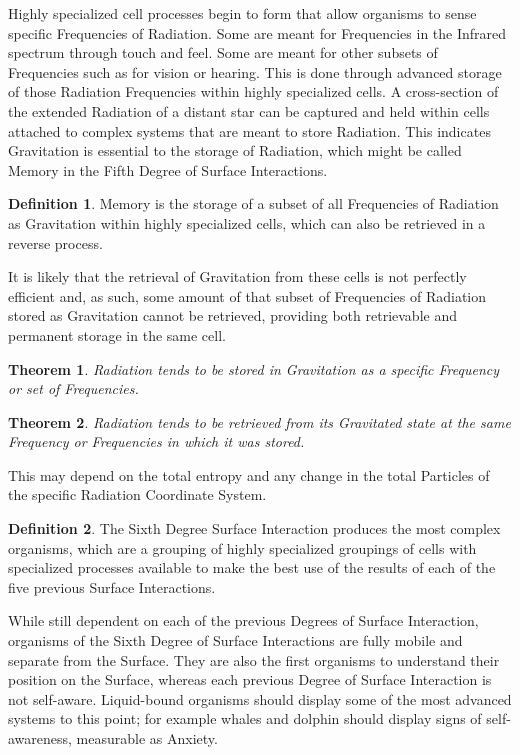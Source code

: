\documentclass[12pt]{article}
\theoremstyle{plain}
\newtheorem{theorem}{Theorem}
\theoremstyle{definition}
\newtheorem{definition}{Definition}
\begin{document}
Highly specialized cell processes begin to form that allow organisms to sense specific Frequencies of Radiation. Some are meant for Frequencies in the Infrared spectrum through touch and feel. Some are meant for other subsets of Frequencies such as for vision or hearing. This is done through advanced storage of those Radiation Frequencies within highly specialized cells. A cross-section of the extended Radiation of a distant star can be captured and held within cells attached to complex systems that are meant to store Radiation. This indicates Gravitation is essential to the storage of Radiation, which might be called Memory in the Fifth Degree of Surface Interactions.

\begin{definition}
Memory is the storage of a subset of all Frequencies of Radiation as Gravitation within highly specialized cells, which can also be retrieved in a reverse process.
\end{definition}

It is likely that the retrieval of Gravitation from these cells is not perfectly efficient and, as such, some amount of that subset of Frequencies of Radiation stored as Gravitation cannot be retrieved, providing both retrievable and permanent storage in the same cell.

\begin{theorem}
Radiation tends to be stored in Gravitation as a specific Frequency or set of Frequencies.
\end{theorem}

\begin{theorem}
Radiation tends to be retrieved from its Gravitated state at the same Frequency or Frequencies in which it was stored.
\end{theorem}

This may depend on the total entropy and any change in the total Particles of the specific Radiation Coordinate System.

\begin{definition}
The Sixth Degree Surface Interaction produces the most complex organisms, which are a grouping of highly specialized groupings of cells with specialized processes available to make the best use of the results of each of the five previous Surface Interactions.
\end{definition}

While still dependent on each of the previous Degrees of Surface Interaction, organisms of the Sixth Degree of Surface Interactions are fully mobile and separate from the Surface. They are also the first organisms to understand their position on the Surface, whereas each previous Degree of Surface Interaction is not self-aware. Liquid-bound organisms should display some of the most advanced systems to this point; for example whales and dolphin should display signs of self-awareness, measurable as Anxiety.
\end{document}
